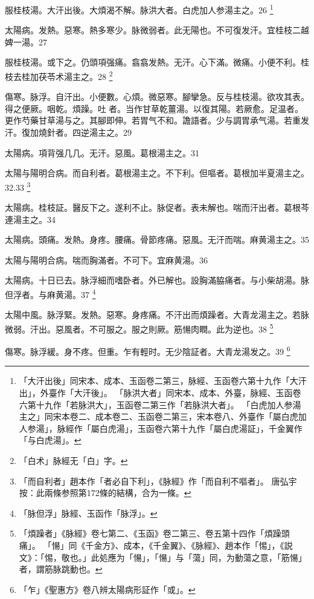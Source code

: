 服桂枝湯。大汗出{\khaaitp 後}。大煩渴不解。脉洪大者。白虎{\khaaitp 加人参}湯主之。26
	\footnote{
		「大汗出後」同宋本、成本、玉函卷二第三，脉經、玉函卷六第十九作「大汗出」，外臺作「大汗後」。
		「脉洪大者」同宋本、成本、外臺，脉經、玉函卷六第十九作「若脉洪大」，玉函卷二第三作「若脉洪大者」。
		「白虎加人参湯主之」同宋本卷二、成本卷二、玉函卷二第三，宋本卷八、外臺作「屬白虎加人参湯」，脉經作「屬白虎湯」，玉函卷六第十九作「屬白虎湯証」，千金翼作「与白虎湯」。
	}

太陽病。发熱。惡寒。熱多寒少。脉微弱者。此无陽也。不可{\khaaitp 復}发汗。{\khaaitp 宜桂枝二越婢一湯。}27

服桂枝湯。{\khaaitp 或}下之。仍頭項强痛。翕翕发熱。无汗。心下滿。微痛。小便不利。桂枝去桂加茯苓术湯主之。28
	\footnote{
		「白术」脉經无「白」字。
	}

傷寒。脉浮。自汗出。小便數。心煩。微惡寒。腳攣急。反与桂枝湯。欲攻其表。得之便厥。咽乾。煩躁。吐{\sungtpii 𠱘}者。当作甘草乾薑湯。以復其陽。若厥愈。足温者。更作芍藥甘草湯与之。其腳即伸。若胃气不和。譫語者。少与{\khaaitp 調胃}承气湯。若重发汗。復加燒針者。四逆湯主之。29

太陽病。項背强几几。无汗。惡風。葛根湯主之。31

太陽与陽明合病。而自利{\khaaitp 者}。葛根湯主之。不下利。但嘔者。葛根加半夏湯主之。32.33
	\footnote{
		「而自利者」趙本作「者必自下利」，《脉經》作「而自利不嘔者」。
		唐弘宇按：此兩條参照第172條的結構，合为一條。
	}

太陽病。桂枝証。醫反下之。遂利不止。脉促者。表未解也。喘而汗出者。葛根芩連湯主之。34

太陽病。頭痛。发熱。身疼。腰痛。骨節疼痛。惡風。无汗而喘。麻黄湯主之。35

太陽与陽明合病。喘而胸滿者。不可下。宜麻黄湯。36

太陽病。十日已去。脉浮細而嗜卧者。外已解也。設胸滿脇痛者。与小柴胡湯。脉{\khaaitp 但}浮者。与麻黄湯。37
	\footnote{
		「脉但浮」脉經、玉函作「脉浮」。
	}

太陽中風。脉浮緊。发熱。惡寒。身疼痛。不汗出而煩躁者。大青龙湯主之。若脉微弱。汗出。惡風者。不可服之。服之則厥。筋愓肉瞤。此为逆也。38
	\footnote{
		「煩躁者」《脉經》卷七第二、《玉函》卷二第三、卷五第十四作「煩躁頭痛」。
		「愓」同《千金方》、成本，《千金翼》、《脉經》、趙本作「惕」，《説文》：「惕，敬也。」此処應为「愓」，「愓」与「蕩」同，为動蕩之意，「筋愓」者，謂筋脉跳動也。
	}

傷寒。脉浮緩。身不疼。但重。乍有輕时。无少陰証者。大青龙湯发之。39
	\footnote{
		「乍」《聖惠方》卷八辨太陽病形証作「或」。
	}

